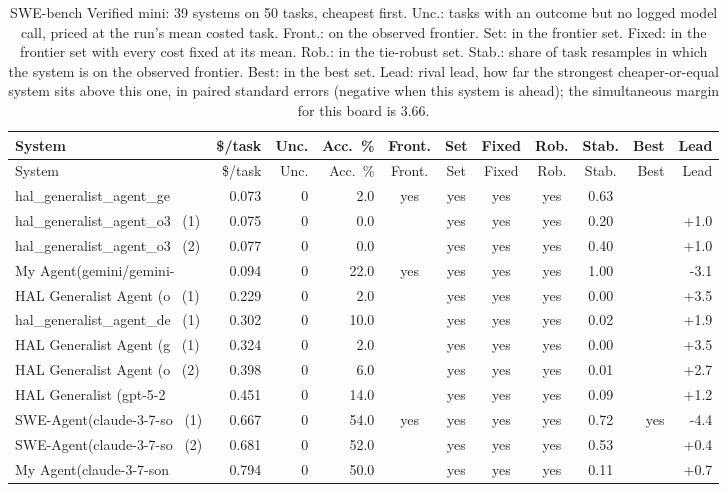 {\begin{longtable}{lrrrcccccrr}
\caption{SWE-bench Verified mini: 39 systems on 50 tasks, cheapest first. Unc.: tasks with an outcome but no logged model call, priced at the run's mean costed task. Front.: on the observed frontier. Set: in the frontier set. Fixed: in the frontier set with every cost fixed at its mean. Rob.: in the tie-robust set. Stab.: share of task resamples in which the system is on the observed frontier. Best: in the best set. Lead: rival lead, how far the strongest cheaper-or-equal system sits above this one, in paired standard errors (negative when this system is ahead); the simultaneous margin for this board is 3.66.}\label{tab:supp-hal_swebench_verified_mini}\\
\toprule
System & \$/task & Unc. & Acc.\ \% & Front. & Set & Fixed & Rob. & Stab. & Best & Lead \\
\midrule
\endfirsthead
\toprule
System & \$/task & Unc. & Acc.\ \% & Front. & Set & Fixed & Rob. & Stab. & Best & Lead \\
\midrule
\endhead
\bottomrule
\endfoot
hal\_generalist\_agent\_ge~ & 0.073 & 0 & 2.0 & yes & yes & yes & yes & 0.63 &  &  \\
hal\_generalist\_agent\_o3~ (1) & 0.075 & 0 & 0.0 &  & yes & yes & yes & 0.20 &  & +1.0 \\
hal\_generalist\_agent\_o3~ (2) & 0.077 & 0 & 0.0 &  & yes & yes & yes & 0.40 &  & +1.0 \\
My Agent(gemini/gemini-~ & 0.094 & 0 & 22.0 & yes & yes & yes & yes & 1.00 &  & -3.1 \\
HAL Generalist Agent (o~ (1) & 0.229 & 0 & 2.0 &  & yes & yes & yes & 0.00 &  & +3.5 \\
hal\_generalist\_agent\_de~ (1) & 0.302 & 0 & 10.0 &  & yes & yes & yes & 0.02 &  & +1.9 \\
HAL Generalist Agent (g~ (1) & 0.324 & 0 & 2.0 &  & yes & yes & yes & 0.00 &  & +3.5 \\
HAL Generalist Agent (o~ (2) & 0.398 & 0 & 6.0 &  & yes & yes & yes & 0.01 &  & +2.7 \\
HAL Generalist (gpt-5-2~ & 0.451 & 0 & 14.0 &  & yes & yes & yes & 0.09 &  & +1.2 \\
SWE-Agent(claude-3-7-so~ (1) & 0.667 & 0 & 54.0 & yes & yes & yes & yes & 0.72 & yes & -4.4 \\
SWE-Agent(claude-3-7-so~ (2) & 0.681 & 0 & 52.0 &  & yes & yes & yes & 0.53 &  & +0.4 \\
My Agent(claude-3-7-son~ & 0.794 & 0 & 50.0 &  & yes & yes & yes & 0.11 &  & +0.7 \\

\end{longtable}}
